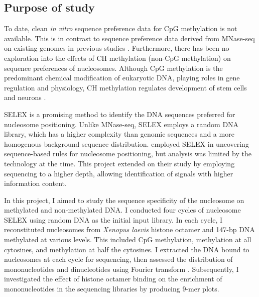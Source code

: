 \documentclass[parskip=full, numbers=noenddot]{scrreprt}
\begin{document}
\subsection{Purpose of study}
\label{ssec:emsaselex_intro_why}


To date, clean \emph{in vitro} sequence preference data for CpG methylation is not available.  This is in contrast to sequence preference data derived from MNase-seq on existing genomes in previous studies \citep{struhl_determinants_2013, segal_genomic_2006, huff_dnmt1-independent_2014}.  Furthermore, there has been no exploration into the effects of CH methylation (non-CpG methylation) on sequence preferences of nucleosomes.  Although CpG methylation is the predominant chemical modification of eukaryotic DNA, playing roles in gene regulation and physiology, CH methylation regulates development of stem cells and neurons \citep{guo_distribution_2014}.

SELEX is a promising method to identify the DNA sequences preferred for nucleosome positioning.  Unlike MNase-seq, SELEX employs a random DNA library, which has a higher complexity than genomic sequences and a more homogenous background sequence distribution.  \citet{lowary_new_1998} employed SELEX in uncovering sequence-based rules for nucleosome positioning, but analysis was limited by the technology at the time.  This project extended on their study by employing sequencing to a higher depth, allowing identification of signals with higher information content.

In this project, I aimed to study the sequence specificity of the nucleosome on methylated and non-methylated DNA.  I conducted four cycles of nucleosome SELEX using random DNA as the initial input library.  In each cycle, I reconstituted nucleosomes from \emph{Xenopus laevis} histone octamer and 147-bp DNA \citep{dyer_reconstitution_2003} methylated at various levels.  This included CpG methylation, methylation at all cytosines, and methylation at half the cytosines.  I extracted the DNA bound to nucleosomes at each cycle for sequencing, then assessed the distribution of mononucleotides and dinucleotides using Fourier transform \citep{lowary_new_1998, zhu_interaction_2018}.  Subsequently, I investigated the effect of histone octamer binding on the enrichment of mononucleotides in the sequencing libraries by producing 9-mer plots.
\end{document}
